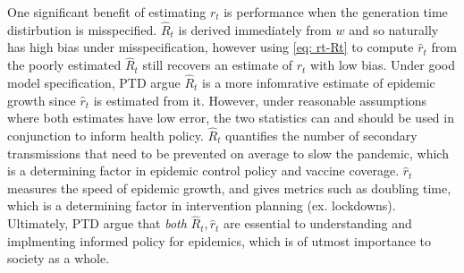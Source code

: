 \documentclass[12pt]{article}
\begin{document}
      One significant benefit of estimating $r_t$ is performance when the generation time distirbution 
      is misspecified. $\hat{R}_t$ is derived immediately from $w$ and so naturally has high bias under misspecification, 
      however using \cref{eq: rt-Rt} to compute $\hat{r}_t$ from the poorly estimated $\hat{R}_t$ 
      still recovers an estimate of $r_t$ with low bias. 
      Under good model specification, PTD argue $\hat{R}_t$ is a more infomrative estimate of epidemic growth 
      since $\hat{r}_t$ is estimated from it. However, under reasonable assumptions where both estimates have low error, 
      the two statistics can and should be used in conjunction to inform health policy. $\hat{R}_t$ quantifies the number of
      secondary transmissions that need to be prevented on average to slow the pandemic, which is a determining factor in 
      epidemic control policy and vaccine coverage. $\hat{r}_t$ measures the speed of epidemic growth, 
      and gives metrics such as doubling time, which is a determining factor in intervention planning (ex. lockdowns). 
      Ultimately, PTD argue that \textit{both} $\hat{R}_t, \hat{r}_t$ are essential to understanding and 
      implmenting informed policy for epidemics, which is of utmost importance to society as a whole.
\end{document}
